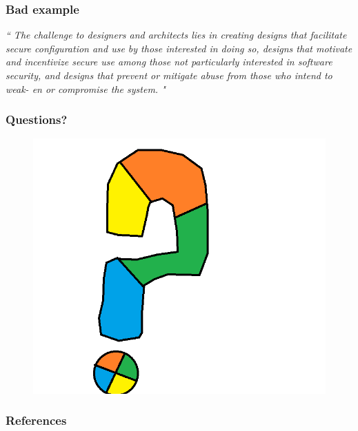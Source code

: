 \documentclass[12pt,norsk]{beamer}
\begin{document}
\begin{frame}
\frametitle{Bad example}

\textit{ `` The challenge to designers and architects lies in creating designs that facilitate secure configuration and use by those interested in doing so, designs that motivate and incentivize secure use among those not particularly interested in software security, and designs that prevent or mitigate abuse from those who intend to weak- en or compromise the system. "}

\end{frame}

\begin{frame}

	\frametitle{Questions?}
		

	\begin{figure}[h]
    	\centering
    	\includegraphics[scale=0.45]{images/questionmark.png}
    
	\end{figure}

\end{frame}


\begin{frame}

	\frametitle{References}
		
	
		

\end{frame}




\end{document}
